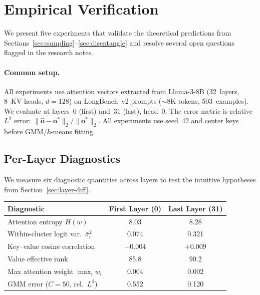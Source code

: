 \documentclass[11pt,a4paper]{article}
\theoremstyle{definition}
\newcommand{\oo}{\mathbf{o}}
\begin{document}
\section{Empirical Verification}\label{sec:experiments}

We present five experiments that validate the theoretical predictions from
Sections~\ref{sec:sampling}--\ref{sec:disentangle} and resolve several open
questions flagged in the research notes.

\paragraph{Common setup.}
All experiments use attention vectors extracted from Llama-3-8B (32~layers,
8~KV heads, $d=128$) on LongBench~v2 prompts (${\sim}8$K tokens, 503~examples).
We evaluate at layers~0 (first) and~31 (last), head~0.  The error metric is
relative $L^2$ error:
$\|\hat{\oo} - \oo^*\|_2 / \|\oo^*\|_2$.
All experiments use seed~42 and center keys before GMM/$k$-means fitting.

\subsection{Per-Layer Diagnostics}\label{sec:exp-diagnostics}

We measure six diagnostic quantities across layers to test the intuitive
hypotheses from Section~\ref{sec:layer-diff}.

\begin{center}
\small
\begin{tabular}{lcc}
\toprule
\textbf{Diagnostic} & \textbf{First Layer (0)} & \textbf{Last Layer (31)}\\
\midrule
Attention entropy $H(w)$           & 8.03  & 8.28\\
Within-cluster logit var.\ $\bar{\sigma}_c^2$ & 0.074 & 0.321\\
Key--value cosine correlation      & $-0.004$ & $+0.009$\\
Value effective rank               & 85.8  & 90.2\\
Max attention weight $\max_i w_i$  & 0.004 & 0.002\\
GMM error ($C{=}50$, rel.\ $L^2$)  & 0.552 & 0.120\\
\bottomrule
\end{tabular}
\end{center}
\end{document}
